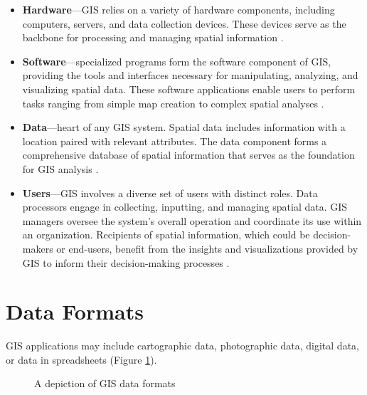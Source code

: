 \begin{itemize}
    \item \textbf{Hardware}---GIS relies on a variety of hardware components, including computers, servers, and data collection devices. These devices serve as the backbone for processing and managing spatial information \cite{gis2018geographic}.
    \item \textbf{Software}---specialized programs form the software component of GIS, providing the tools and interfaces necessary for manipulating, analyzing, and visualizing spatial data. These software applications enable users to perform tasks ranging from simple map creation to complex spatial analyses \cite{gis2018geographic}.
    \item \textbf{Data}---heart of any GIS system. Spatial data includes information with a location paired with relevant attributes. The data component forms a comprehensive database of spatial information that serves as the foundation for GIS analysis \cite{gis2018geographic}.
    \item \textbf{Users}---GIS involves a diverse set of users with distinct roles. Data processors engage in collecting, inputting, and managing spatial data. GIS managers oversee the system's overall operation and coordinate its use within an organization. Recipients of spatial information, which could be decision-makers or end-users, benefit from the insights and visualizations provided by GIS to inform their decision-making processes \cite{gis2018geographic}.
\end{itemize}

\section{Data Formats}

GIS applications may include cartographic data, photographic data, digital data, or data in spreadsheets \cite{gis2018geographic} (Figure \ref{fig:gis-data-format}).

\begin{figure}[ht]
	\centering
	
	\caption{A depiction of GIS data formats \cite{gis2018geographic}}
	\label{fig:gis-data-format}
\end{figure}

